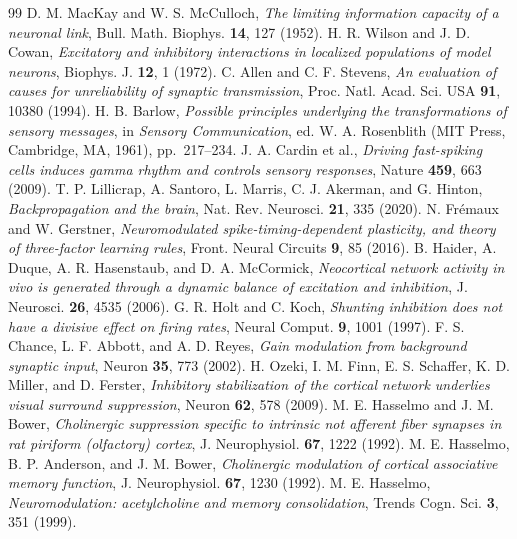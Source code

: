 \begin{thebibliography}{99}
 D. M. MacKay and W. S. McCulloch, \emph{The limiting information capacity of a neuronal link}, Bull. Math. Biophys. \textbf{14}, 127 (1952).
 H. R. Wilson and J. D. Cowan, \emph{Excitatory and inhibitory interactions in localized populations of model neurons}, Biophys. J. \textbf{12}, 1 (1972).
 C. Allen and C. F. Stevens, \emph{An evaluation of causes for unreliability of synaptic transmission}, Proc. Natl. Acad. Sci. USA \textbf{91}, 10380 (1994).
 H. B. Barlow, \emph{Possible principles underlying the transformations of sensory messages}, in \emph{Sensory Communication}, ed. W. A. Rosenblith (MIT Press, Cambridge, MA, 1961), pp.~217--234.
 J. A. Cardin et al., \emph{Driving fast-spiking cells induces gamma rhythm and controls sensory responses}, Nature \textbf{459}, 663 (2009).
 T. P. Lillicrap, A. Santoro, L. Marris, C. J. Akerman, and G. Hinton, \emph{Backpropagation and the brain}, Nat. Rev. Neurosci. \textbf{21}, 335 (2020).
 N. Fr\'emaux and W. Gerstner, \emph{Neuromodulated spike-timing-dependent plasticity, and theory of three-factor learning rules}, Front. Neural Circuits \textbf{9}, 85 (2016).
 B. Haider, A. Duque, A. R. Hasenstaub, and D. A. McCormick, \emph{Neocortical network activity in vivo is generated through a dynamic balance of excitation and inhibition}, J. Neurosci. \textbf{26}, 4535 (2006).
 G. R. Holt and C. Koch, \emph{Shunting inhibition does not have a divisive effect on firing rates}, Neural Comput. \textbf{9}, 1001 (1997).
 F. S. Chance, L. F. Abbott, and A. D. Reyes, \emph{Gain modulation from background synaptic input}, Neuron \textbf{35}, 773 (2002).
 H. Ozeki, I. M. Finn, E. S. Schaffer, K. D. Miller, and D. Ferster, \emph{Inhibitory stabilization of the cortical network underlies visual surround suppression}, Neuron \textbf{62}, 578 (2009).
 M. E. Hasselmo and J. M. Bower, \emph{Cholinergic suppression specific to intrinsic not afferent fiber synapses in rat piriform (olfactory) cortex}, J. Neurophysiol. \textbf{67}, 1222 (1992).
 M. E. Hasselmo, B. P. Anderson, and J. M. Bower, \emph{Cholinergic modulation of cortical associative memory function}, J. Neurophysiol. \textbf{67}, 1230 (1992).
 M. E. Hasselmo, \emph{Neuromodulation: acetylcholine and memory consolidation}, Trends Cogn. Sci. \textbf{3}, 351 (1999).

\end{thebibliography}
